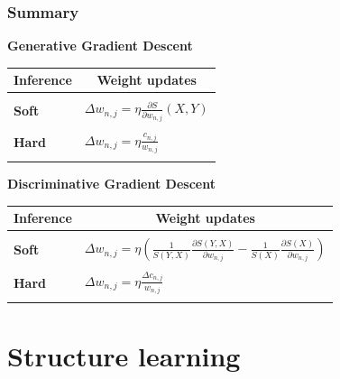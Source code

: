 \documentclass{beamer}
\newcommand{\ddspn}[2]{\frac{\partial#1}{\partial#2}}
\begin{document}
\begin{frame}
  \frametitle{Summary}

  \scriptsize
  \begin{center}\footnotesize\textbf{Generative Gradient Descent}\end{center}\vspace{-0.25cm}
  \begin{table}[h]
    \centering
    \begin{tabular}{l|l}
      \hline
      \multicolumn{1}{c}{\bfseries Inference} & \multicolumn{1}{c}{\bfseries Weight updates}\\
      \hline & \\
      \textbf{Soft} & \(\displaystyle \Delta w_{n,j}=\eta\ddspn{S}{w_{n,j}}(X, Y)\) \\
      & \\
      \textbf{Hard} & \(\displaystyle \Delta w_{n,j}=\eta\frac{c_{n,j}}{w_{n,j}}\) \\
      & \\
      \hline
    \end{tabular}
  \end{table}

  \begin{center}\footnotesize\textbf{Discriminative Gradient Descent}\end{center}\vspace{-0.25cm}
  \begin{table}[h]
    \centering
    \begin{tabular}{l|l}
      \hline
      \multicolumn{1}{c}{\bfseries Inference} & \multicolumn{1}{c}{\bfseries Weight updates}\\
      \hline & \\
      \textbf{Soft} & \(\displaystyle \Delta
        w_{n,j}=\eta\left(\frac{1}{S(Y,X)}\ddspn{S(Y,X)}{w_{n,j}}-\frac{1}{S(X)}
          \ddspn{S(X)}{w_{n,j}}\right)\) \\
      & \\
      \textbf{Hard} & \(\displaystyle \Delta w_{n,j}=\eta\frac{\Delta c_{n,j}}{w_{n,j}}\) \\
      & \\
      \hline
    \end{tabular}
  \end{table}

\end{frame}

\section{Structure learning}
\end{document}
